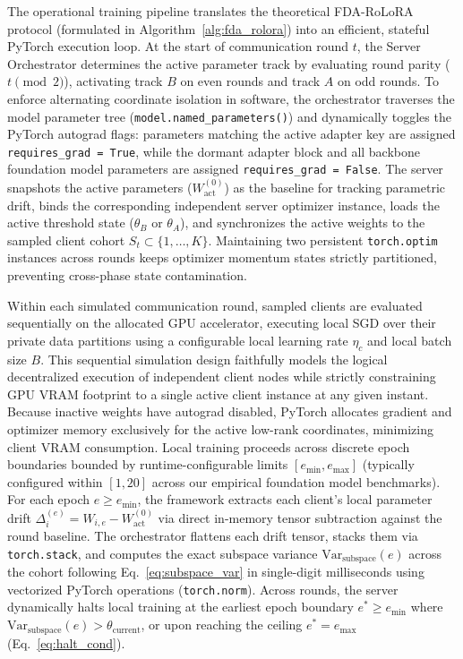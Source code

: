 The operational training pipeline translates the theoretical FDA-RoLoRA protocol (formulated in Algorithm~\ref{alg:fda_rolora}) into an efficient, stateful PyTorch execution loop. At the start of communication round $t$, the Server Orchestrator determines the active parameter track by evaluating round parity ($t \pmod 2$), activating track $B$ on even rounds and track $A$ on odd rounds. To enforce alternating coordinate isolation in software, the orchestrator traverses the model parameter tree (\texttt{model.named\_parameters()}) and dynamically toggles the PyTorch autograd flags: parameters matching the active adapter key are assigned \texttt{requires\_grad = True}, while the dormant adapter block and all backbone foundation model parameters are assigned \texttt{requires\_grad = False}. The server snapshots the active parameters ($W_{\text{act}}^{(0)}$) as the baseline for tracking parametric drift, binds the corresponding independent server optimizer instance, loads the active threshold state ($\theta_B$ or $\theta_A$), and synchronizes the active weights to the sampled client cohort $S_t \subset \{1, \dots, K\}$. Maintaining two persistent \texttt{torch.optim} instances across rounds keeps optimizer momentum states strictly partitioned, preventing cross-phase state contamination.

Within each simulated communication round, sampled clients are evaluated sequentially on the allocated GPU accelerator, executing local SGD over their private data partitions using a configurable local learning rate $\eta_c$ and local batch size $B$. This sequential simulation design faithfully models the logical decentralized execution of independent client nodes while strictly constraining GPU VRAM footprint to a single active client instance at any given instant. Because inactive weights have autograd disabled, PyTorch allocates gradient and optimizer memory exclusively for the active low-rank coordinates, minimizing client VRAM consumption. Local training proceeds across discrete epoch boundaries bounded by runtime-configurable limits $[e_{\min}, e_{\max}]$ (typically configured within $[1, 20]$ across our empirical foundation model benchmarks). For each epoch $e \ge e_{\min}$, the framework extracts each client's local parameter drift $\Delta_i^{(e)} = W_{i,e} - W_{\text{act}}^{(0)}$ via direct in-memory tensor subtraction against the round baseline. The orchestrator flattens each drift tensor, stacks them via \texttt{torch.stack}, and computes the exact subspace variance $\text{Var}_{\text{subspace}}(e)$ across the cohort following Eq.~\ref{eq:subspace_var} in single-digit milliseconds using vectorized PyTorch operations (\texttt{torch.norm}). Across rounds, the server dynamically halts local training at the earliest epoch boundary $e^* \ge e_{\min}$ where $\text{Var}_{\text{subspace}}(e) > \theta_{\text{current}}$, or upon reaching the ceiling $e^* = e_{\max}$ (Eq.~\ref{eq:halt_cond}).

